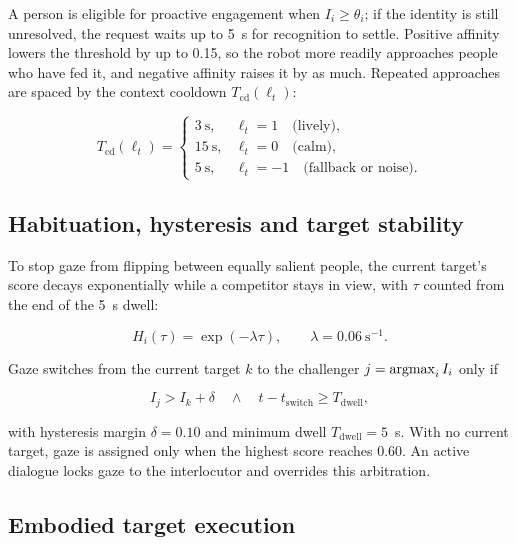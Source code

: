 A person is eligible for proactive engagement when $I_i \geq \theta_i$; if the identity is still unresolved, the request waits up to 5~s for recognition to settle. Positive affinity lowers the threshold by up to 0.15, so the robot more readily approaches people who have fed it, and negative affinity raises it by as much. Repeated approaches are spaced by the context cooldown $T_{\mathrm{cd}}(\ell_t)$:

\begin{equation}
    T_{\mathrm{cd}}(\ell_t)=
    \begin{cases}
        3~\mathrm{s}, & \ell_t=1 \quad \text{(lively)},\\
        15~\mathrm{s}, & \ell_t=0 \quad \text{(calm)},\\
        5~\mathrm{s}, & \ell_t=-1 \quad \text{(fallback or noise)}.
    \end{cases}
    \label{eq:context-cooldown}
\end{equation}

\subsection{Habituation, hysteresis and target stability}
\label{subsec:habituation-hysteresis}

To stop gaze from flipping between equally salient people, the current target's score decays exponentially while a competitor stays in view, with $\tau$ counted from the end of the 5~s dwell:

\begin{equation}
    H_i(\tau)=\exp(-\lambda\tau), \qquad \lambda=0.06\ \mathrm{s}^{-1}.
    \label{eq:habituation}
\end{equation}

Gaze switches from the current target $k$ to the challenger $j = \operatorname*{argmax}_i I_i$ only if

\begin{equation}
    I_j > I_k + \delta \quad\land\quad t - t_{\mathrm{switch}} \geq T_{\mathrm{dwell}},
    \label{eq:switch-suppression}
\end{equation}

with hysteresis margin $\delta=0.10$ and minimum dwell $T_{\mathrm{dwell}}=5$~s. With no current target, gaze is assigned only when the highest score reaches 0.60. An active dialogue locks gaze to the interlocutor and overrides this arbitration.

\subsection{Embodied target execution}
\label{subsec:embodied-target-execution}

